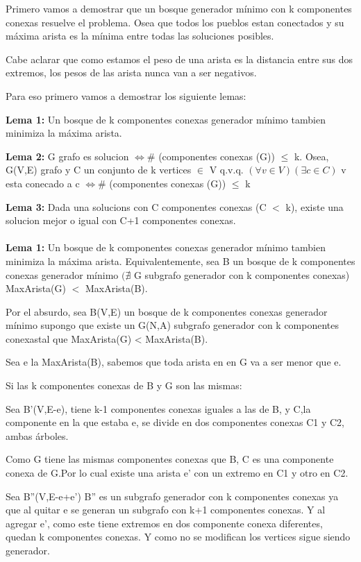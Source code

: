 Primero vamos a demostrar que un bosque generador mínimo con k componentes conexas resuelve el problema. Osea que todos los pueblos estan conectados y su máxima arista es la mínima entre todas las soluciones posibles.

Cabe aclarar que como estamos el peso de una arista es la distancia entre sus dos extremos, los pesos de las arista nunca van a ser negativos.

Para eso primero vamos a demostrar los siguiente lemas:

\textbf{Lema 1:} Un bosque de k componentes conexas generador mínimo tambien minimiza la máxima arista.

\textbf{Lema 2:} G grafo es solucion $\Leftrightarrow \#$ (componentes conexas (G)) $\leq$ k. Osea,  G(V,E) grafo y C un conjunto de k vertices $\in $ V q.v.q. $(\forall v \in V)(\exists c \in C)$ v esta conecado a c $\Leftrightarrow \#$ (componentes conexas (G)) $\leq$ k

\textbf{Lema 3:} Dada una solucions con C componentes conexas (C $<$ k), existe una solucion mejor o igual con C+1 componentes conexas. \\ \\ 


\textbf{Lema 1:} Un bosque de k componentes conexas generador mínimo tambien minimiza la máxima arista. Equivalentemente, sea B un bosque de k componentes conexas generador mínimo $(\nexists$ G subgrafo generador con k componentes conexas) MaxArista(G) $<$ MaxArista(B).

Por el absurdo, sea B(V,E) un bosque de k componentes conexas generador mínimo supongo que existe un G(N,A) subgrafo generador con k componentes conexastal que MaxArista(G) < MaxArista(B).

Sea e la MaxArista(B), sabemos que toda arista en en G va a ser menor que e.

Si las k componentes conexas de B y G son las mismas:

Sea B'(V,E-e), tiene k-1 componentes conexas iguales a las de B, y C,la componente en la que estaba e, se divide en dos componentes conexas C1 y C2, ambas árboles.

Como G tiene las mismas componentes conexas que B, C es una componente conexa de G.Por lo cual existe una arista e' con un extremo en C1 y otro en C2.

Sea B''(V,E-e+e') B'' es un subgrafo generador con k componentes conexas ya que al quitar e se generan un subgrafo con k+1 componentes conexas. Y al agregar e', como este  tiene extremos en dos componente conexa diferentes, quedan k componentes conexas. Y como no se modifican los vertices sigue siendo generador.

